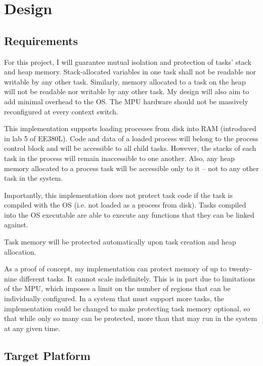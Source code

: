 \chapter{Design}

\section{Requirements}

For this project, I will guarantee mutual isolation and protection of tasks' stack and heap memory. Stack-allocated variables in one task shall not be readable nor writable by any other task. Similarly, memory allocated to a task on the heap will not be readable nor writable by any other task. My design will also aim to add minimal overhead to the OS. The MPU hardware should not be massively reconfigured at every context switch.

This implementation supports loading processes from disk into RAM (introduced in lab 5 of EE380L). Code and data of a loaded process will belong to the process control block and will be accessible to all child tasks. However, the stacks of each task in the process will remain inaccessible to one another. Also, any heap memory allocated to a process task will be accessible only to it -- not to any other task in the system.

Importantly, this implementation does not protect task code if the task is compiled with the OS (i.e. not loaded as a process from disk). Tasks compiled into the OS executable are able to execute any functions that they can be linked against.

Task memory will be protected automatically upon task creation and heap allocation.

As a proof of concept, my implementation can protect memory of up to twenty-nine different tasks. It cannot scale indefinitely. This is in part due to limitations of the MPU, which imposes a limit on the number of regions that can be individually configured. In a system that must support more tasks, the implementation could be changed to make protecting task memory optional, so that while only so many can be protected, more than that may run in the system at any given time.

\section{Target Platform}


